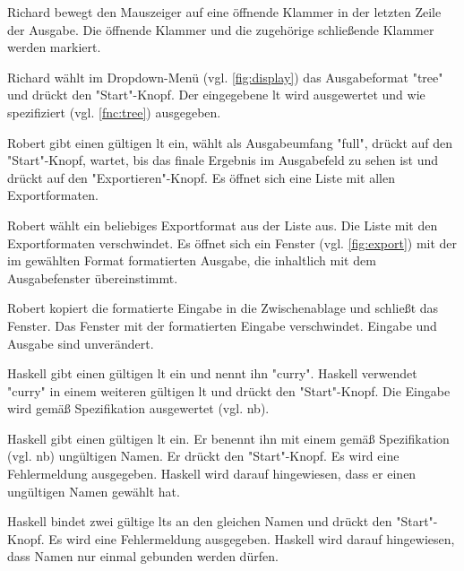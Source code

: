\documentclass[parskip=full,11pt,twoside]{scrartcl}
\begin{document}
{Richard bewegt den Mauszeiger auf eine öffnende Klammer in der letzten Zeile der Ausgabe.}
{Die öffnende Klammer und die zugehörige schließende Klammer werden markiert.}

{Richard wählt im Dropdown-Menü (vgl. \cref{fig:display}) das Ausgabeformat "tree" und drückt den "Start"-Knopf.}
{Der eingegebene \gls{lt} wird ausgewertet und wie spezifiziert (vgl. \ref{fnc:tree}) ausgegeben.}


{Robert gibt einen gültigen \gls{lt} ein, wählt als Ausgabeumfang "full", drückt
auf den "Start"-Knopf, wartet, bis das finale Ergebnis im Ausgabefeld zu sehen ist
und drückt auf den "Exportieren"-Knopf.}
{Es öffnet sich eine Liste mit allen Exportformaten.}

{Robert wählt ein beliebiges Exportformat aus der Liste aus.}
{Die Liste mit den Exportformaten verschwindet.
Es öffnet sich ein Fenster (vgl. \cref{fig:export}) mit der im gewählten Format
formatierten Ausgabe, die
inhaltlich mit dem Ausgabefenster übereinstimmt.}

{Robert kopiert die formatierte Eingabe in die Zwischenablage und schließt das Fenster.}
{Das Fenster mit der formatierten Eingabe verschwindet. Eingabe und Ausgabe sind
unverändert.}
 

{Haskell gibt einen gültigen \gls{lt} ein und nennt ihn "curry".
 Haskell verwendet "curry" in einem weiteren gültigen \gls{lt} und drückt den "Start"-Knopf.}
{Die Eingabe wird gemäß Spezifikation ausgewertet (vgl. \gls{nb}).}

{Haskell gibt einen gültigen \gls{lt} ein.
 Er benennt ihn mit einem gemäß Spezifikation (vgl. \gls{nb}) ungültigen Namen.
 Er drückt den "Start"-Knopf.}
{Es wird eine Fehlermeldung ausgegeben.
 Haskell wird darauf hingewiesen, dass er einen ungültigen Namen gewählt hat.}

{Haskell bindet zwei gültige \glspl{lt} an den gleichen Namen und drückt den "Start"-Knopf.}
{Es wird eine Fehlermeldung ausgegeben. Haskell wird darauf hingewiesen, dass Namen
nur einmal gebunden werden dürfen.}
\end{document}
